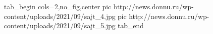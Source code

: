  
 
 
 
 


\ifcmt
  tab_begin cols=2,no_fig,center
		 pic http://news.donnu.ru/wp-content/uploads/2021/09/sajt_4.jpg
     pic http://news.donnu.ru/wp-content/uploads/2021/09/sajt_5.jpg
  tab_end
\fi
